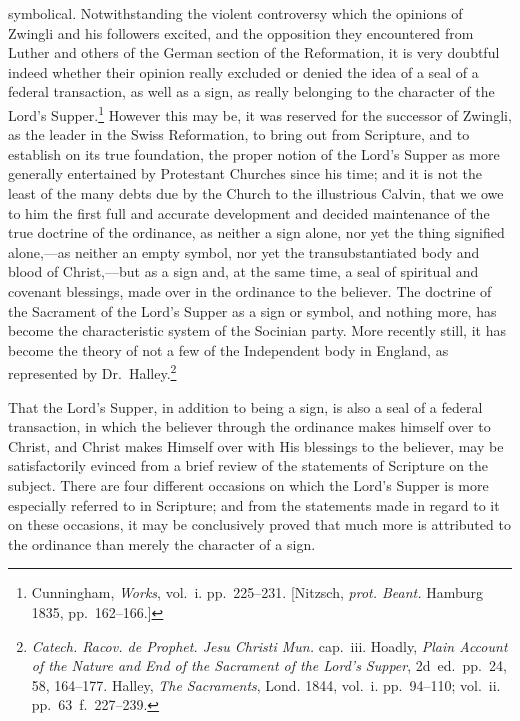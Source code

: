 \documentclass[
]{book}
\begin{document}
symbolical. Notwithstanding the violent controversy which the opinions of Zwingli and his followers excited, and the opposition they encountered from Luther and others of the German section of the Reformation, it is very doubtful indeed whether their opinion really excluded or denied the idea of a seal of a federal transaction, as well as a sign, as really belonging to the character of the Lord's Supper.\footnote{Cunningham, \emph{Works}, vol.~i. pp.~225--231. {[}Nitzsch, \emph{prot. Beant.} Hamburg 1835, pp.~162--166.{]}} However this may be, it was reserved for the successor of Zwingli, as the leader in the Swiss Reformation, to bring out from Scripture, and to establish on its true foundation, the proper notion of the Lord's Supper as more generally entertained by Protestant Churches since his time; and it is not the least of the many debts due by the Church to the illustrious Calvin, that we owe to him the first full and accurate development and decided maintenance of the true doctrine of the ordinance, as neither a sign alone, nor yet the thing signified alone,---as neither an empty symbol, nor yet the transubstantiated body and blood of Christ,---but as a sign and, at the same time, a seal of spiritual and covenant blessings, made over in the ordinance to the believer. The doctrine of the Sacrament of the Lord's Supper as a sign or symbol, and nothing more, has become the characteristic system of the Socinian party. More recently still, it has become the theory of not a few of the Independent body in England, as represented by Dr.~Halley.\footnote{\emph{Catech. Racov. de Prophet. Jesu Christi Mun.} cap.~iii. Hoadly, \emph{Plain Account of the Nature and End of the Sacrament of the Lord's Supper}, 2d~ed.~pp.~24, 58, 164--177. Halley, \emph{The Sacraments}, Lond. 1844, vol.~i. pp.~94--110; vol.~ii. pp.~63~f.~227--239.}

That the Lord's Supper, in addition to being a sign, is also a seal of a federal transaction, in which the believer through the ordinance makes himself over to Christ, and Christ makes Himself over with His blessings to the believer, may be satisfactorily evinced from a brief review of the statements of Scripture on the subject. There are four different occasions on which the Lord's Supper is more especially referred to in Scripture; and from the statements made in regard to it on these occasions, it may be conclusively proved that much more is attributed to the ordinance than merely the character of a sign.
\end{document}
